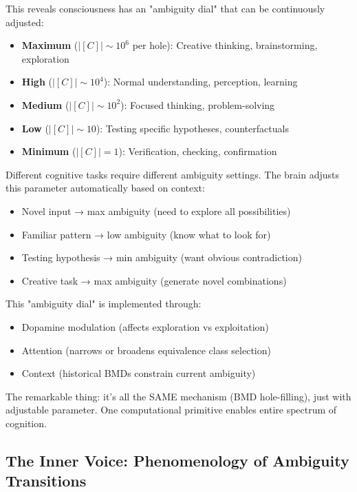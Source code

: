 \documentclass[11pt,a4paper]{article}
\begin{document}
\begin{remark}
This reveals consciousness has an "ambiguity dial" that can be continuously adjusted:

\begin{itemize}
\item \textbf{Maximum} ($|[C]| \sim 10^6$ per hole): Creative thinking, brainstorming, exploration
\item \textbf{High} ($|[C]| \sim 10^4$): Normal understanding, perception, learning
\item \textbf{Medium} ($|[C]| \sim 10^2$): Focused thinking, problem-solving
\item \textbf{Low} ($|[C]| \sim 10$): Testing specific hypotheses, counterfactuals
\item \textbf{Minimum} ($|[C]| = 1$): Verification, checking, confirmation
\end{itemize}

Different cognitive tasks require different ambiguity settings. The brain adjusts this parameter automatically based on context:
\begin{itemize}
\item Novel input → max ambiguity (need to explore all possibilities)
\item Familiar pattern → low ambiguity (know what to look for)
\item Testing hypothesis → min ambiguity (want obvious contradiction)
\item Creative task → max ambiguity (generate novel combinations)
\end{itemize}

This "ambiguity dial" is implemented through:
\begin{itemize}
\item Dopamine modulation (affects exploration vs exploitation)
\item Attention (narrows or broadens equivalence class selection)
\item Context (historical BMDs constrain current ambiguity)
\end{itemize}

The remarkable thing: it's all the SAME mechanism (BMD hole-filling), just with adjustable parameter. One computational primitive enables entire spectrum of cognition.
\end{remark}

\subsection{The Inner Voice: Phenomenology of Ambiguity Transitions}
\end{document}
